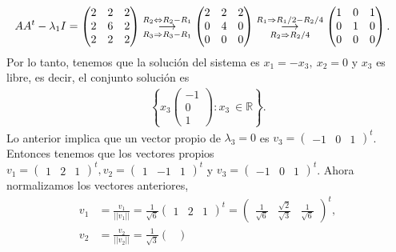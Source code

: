 \documentclass[11pt,letterpaper]{article}
\newcommand{\mR}{\mathbb{R}}
\newcommand{\grstep}[2][\relax]{%
   \ensuremath{\mathrel{
       {\mathop{\longrightarrow}\limits^{#2\mathstrut}_{
                                     \begin{subarray}{l} #1 \end{subarray}}}}}}
\begin{document}
\begin{enumerate}
\begin{align*}
AA^t-\lambda_1I&=\begin{pmatrix}
2 & 2 & 2 \\
2& 6 & 2\\
2 & 2 & 2
\end{pmatrix}%
\grstep[R_3 \Rightarrow R_3-R_1]{R_2 \Leftrightarrow R_2-R_1}
%
\begin{pmatrix}
2 & 2 & 2 \\
0 & 4 & 0\\
0 & 0 &0
\end{pmatrix}
%
\grstep[R_2\Rightarrow R_2/4]{R_1 \Rightarrow R_1/2-R_2/4}
%
\begin{pmatrix}
1 & 0 & 1 \\
0 & 1 & 0\\
0 & 0 &0
\end{pmatrix}.
\end{align*}
Por lo tanto, tenemos que la solución del sistema es $x_1=-x_3,\ x_2=0$ y $x_3$ es libre, es decir, el conjunto solución es
\begin{align*}
\left\{x_3\begin{pmatrix}
-1\\
0\\
1
\end{pmatrix}: x_3 \ \in \mR \right\}.
\end{align*}
Lo anterior implica que un vector propio de $\lambda_3=0$ es 
$v_3=\begin{pmatrix}
-1 & 0 & 1
\end{pmatrix}^t$. Entonces tenemos que los vectores propios $v_1=\begin{pmatrix}
 1 & 2 & 1
\end{pmatrix}^t, v_2=\begin{pmatrix}
 1 & -1 & 1
\end{pmatrix}^t$ y $v_3=\begin{pmatrix}
-1 & 0 & 1
\end{pmatrix}^t$. Ahora normalizamos los vectores anteriores,
\begin{align*}
v_1&= \frac{v_1}{||v_1||} =\frac{1}{\sqrt{6}} \begin{pmatrix}
1 & 2 & 1
\end{pmatrix}^t = \begin{pmatrix}
\frac{1}{\sqrt{6}} & \frac{\sqrt{2}}{\sqrt{3}} & \frac{1}{\sqrt{6}}
\end{pmatrix}^t,\\
v_2&= \frac{v_2}{||v_2||} =\frac{1}{\sqrt{3}} \begin{pmatrix}

\end{pmatrix}
\end{align*}
\end{enumerate}
\end{document}
